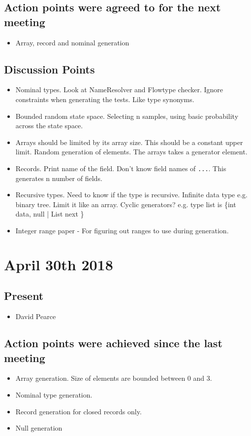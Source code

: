 \documentclass[]{article}
\begin{document}
\subsection{Action points were agreed to for the next meeting}
\begin{itemize}
	\item Array, record and nominal generation
\end{itemize}

\subsection{Discussion Points}
\begin{itemize}
	\item Nominal types. Look at NameResolver and Flowtype checker. Ignore constraints when generating the tests. Like type synonyms.
	\item Bounded random state space. Selecting n samples, using basic probability across the state space.
	\item Arrays should be limited by its array size. This should be a constant upper limit. Random generation of elements. The arrays takes a generator element.
	\item Records. Print name of the field. Don't know field names of \texttt{...}. This generates n number of fields.
	\item Recursive types. Need to know if the type is recursive. Infinite data type e.g. binary tree. Limit it like an array. Cyclic generators? e.g. type list is \{int data, null | List next \}
	\item Integer range paper - For figuring out ranges to use during generation.
\end{itemize}

\section{April 30th 2018}
\subsection{Present}
\begin{itemize}
	\item David Pearce
\end{itemize}

\subsection{Action points were achieved since the last meeting}
\begin{itemize}
	\item Array generation. Size of elements are bounded between 0 and 3.
	\item Nominal type generation.
	\item Record generation for closed records only. 
	\item Null generation
\end{itemize}
\end{document}
